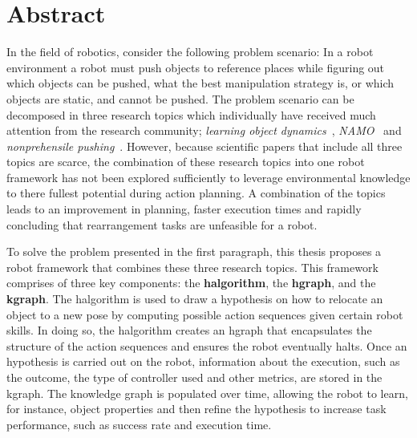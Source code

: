\chapter*{Abstract}
In the field of robotics, consider the following problem scenario: In a robot environment a robot must push objects to reference places while figuring out which objects can be pushed, what the best manipulation strategy is, or which objects are static, and cannot be pushed. The problem scenario can be decomposed in three research topics which individually have received much attention from the research community; \textit{learning object dynamics}~\cite{cong_selfadapting_2020,seegmiller_vehicle_2013}, \textit{\acf{NAMO}}~\cite{chen_fast_2018,elbanhawi_samplingbased_2014,kingston_samplingbased_2018,lavalle_planning_2006} and \textit{nonprehensile pushing}~\cite{arruda_uncertainty_2017,bauza_dataefficient_2018,mericli_pushmanipulation_2015,stuber_featurebased_2018,stuber_let_2020,toussaint_sequenceofconstraints_2022}. However, because scientific papers that include all three topics are scarce, the combination of these research topics into one robot framework has not been explored sufficiently to leverage environmental knowledge to there fullest potential during action planning. A combination of the topics leads to an improvement in planning, faster execution times and rapidly concluding that rearrangement tasks are unfeasible for a robot.\bs

To solve the problem presented in the first paragraph, this thesis proposes a robot framework that combines these three research topics. This framework comprises of three key components: the \textbf{\acl{halgorithm}}, the \textbf{\acl{hgraph}}, and the \textbf{\acl{kgraph}}. The \acl{halgorithm} is used to draw a hypothesis on how to relocate an object to a new pose by computing possible action sequences given certain robot skills. In doing so, the \acl{halgorithm} creates an \acl{hgraph} that encapsulates the structure of the action sequences and ensures the robot eventually halts. Once an hypothesis is carried out on the robot, information about the execution, such as the outcome, the type of controller used and other metrics, are stored in the \acl{kgraph}. The knowledge graph is populated over time, allowing the robot to learn, for instance, object properties and then refine the hypothesis to increase task performance, such as success rate and execution time.\bs

